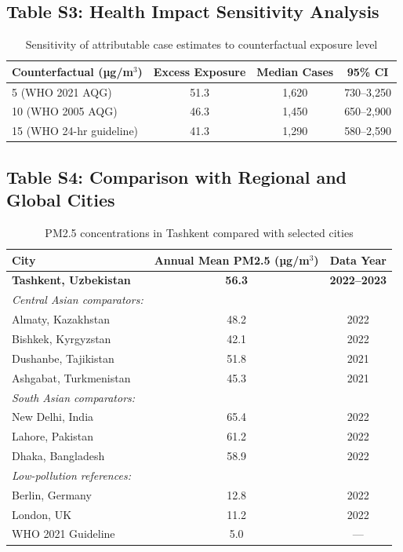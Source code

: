 \documentclass[11pt,a4paper]{article}
\begin{document}
\subsection{Table S3: Health Impact Sensitivity Analysis}

\begin{table}[H]
\centering
\caption{Sensitivity of attributable case estimates to counterfactual exposure level}
\begin{tabular}{lccc}
\toprule
Counterfactual (µg/m$^3$) & Excess Exposure & Median Cases & 95\% CI \\
\midrule
5 (WHO 2021 AQG) & 51.3 & 1,620 & 730--3,250 \\
10 (WHO 2005 AQG) & 46.3 & 1,450 & 650--2,900 \\
15 (WHO 24-hr guideline) & 41.3 & 1,290 & 580--2,590 \\
\bottomrule
\end{tabular}
\end{table}

\subsection{Table S4: Comparison with Regional and Global Cities}

\begin{table}[H]
\centering
\caption{PM2.5 concentrations in Tashkent compared with selected cities}
\begin{tabular}{lcc}
\toprule
City & Annual Mean PM2.5 (µg/m$^3$) & Data Year \\
\midrule
\textbf{Tashkent, Uzbekistan} & \textbf{56.3} & \textbf{2022--2023} \\
\addlinespace
\textit{Central Asian comparators:} & & \\
Almaty, Kazakhstan & 48.2 & 2022 \\
Bishkek, Kyrgyzstan & 42.1 & 2022 \\
Dushanbe, Tajikistan & 51.8 & 2021 \\
Ashgabat, Turkmenistan & 45.3 & 2021 \\
\addlinespace
\textit{South Asian comparators:} & & \\
New Delhi, India & 65.4 & 2022 \\
Lahore, Pakistan & 61.2 & 2022 \\
Dhaka, Bangladesh & 58.9 & 2022 \\
\addlinespace
\textit{Low-pollution references:} & & \\
Berlin, Germany & 12.8 & 2022 \\
London, UK & 11.2 & 2022 \\
WHO 2021 Guideline & 5.0 & --- \\
\bottomrule
\end{tabular}
\end{table}
\end{document}
